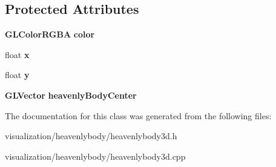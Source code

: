 \subsection*{\-Protected \-Attributes}
\begin{DoxyCompactItemize}
\item 
{\bf \-G\-L\-Color\-R\-G\-B\-A} {\bfseries color}\label{db/d73/classHeavenlyBody3d_a2ebcfe6746f12921e1ef0c9bfeb4a9cb}

\item 
float {\bfseries x}\label{db/d73/classHeavenlyBody3d_a287510419f9dd9019fbfd56154c15f75}

\item 
float {\bfseries y}\label{db/d73/classHeavenlyBody3d_a219f2f76157b162a89a4bbdbec72dbff}

\item 
{\bf \-G\-L\-Vector} {\bfseries heavenly\-Body\-Center}\label{db/d73/classHeavenlyBody3d_a3fa03680a708c4c58d4db74b8fdf58fb}

\end{DoxyCompactItemize}


\-The documentation for this class was generated from the following files\-:\begin{DoxyCompactItemize}
\item 
visualization/heavenlybody/heavenlybody3d.\-h\item 
visualization/heavenlybody/heavenlybody3d.\-cpp\end{DoxyCompactItemize}
